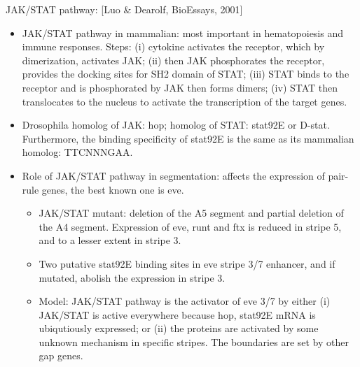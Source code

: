 \documentclass{report}
\begin{document}
JAK/STAT pathway: [Luo \& Dearolf, BioEssays, 2001]
\begin{itemize}
\item JAK/STAT pathway in mammalian: most important in hematopoiesis and immune responses. Steps: (i) cytokine activates the receptor, which by dimerization, activates JAK; (ii) then JAK phosphorates the receptor, provides the docking sites for SH2 domain of STAT; (iii) STAT binds to the receptor and is phosphorated by JAK then forms dimers; (iv) STAT then translocates to the nucleus to activate the transcription of the target genes. 
\item Drosophila homolog of JAK: hop; homolog of STAT: stat92E or D-stat. Furthermore, the binding specificity of stat92E is the same as its mammalian homolog: TTCNNNGAA. 
\item Role of JAK/STAT pathway in segmentation: affects the expression of pair-rule genes, the best known one is eve. 
\begin{itemize}
\item JAK/STAT mutant: deletion of the A5 segment and partial deletion of the A4 segment. Expression of eve, runt and ftx is reduced in stripe 5, and to a lesser extent in stripe 3. 
\item Two putative stat92E binding sites in eve stripe 3/7 enhancer, and if mutated, abolish the expression in stripe 3. 
\item Model: JAK/STAT pathway is the activator of eve 3/7 by either (i) JAK/STAT is active everywhere because hop, stat92E mRNA is ubiqutiously expressed; or (ii) the proteins are activated by some unknown mechanism in specific stripes. The boundaries are set by other gap genes. 
\end{itemize}
\end{itemize}
\end{document}
